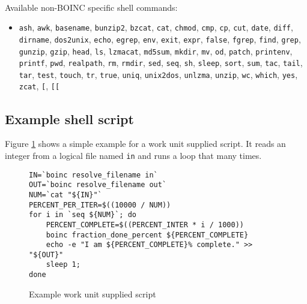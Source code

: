 \documentclass[a4paper,12pt,titlepage,dvipdfm]{article}
\begin{document}
\paragraph*{} Available non-BOINC specific shell commands:
\begin{itemize}
    \item \texttt{ash}, \texttt{awk}, \texttt{basename}, \texttt{bunzip2}, \texttt{bzcat}, \texttt{cat}, \texttt{chmod}, \texttt{cmp}, \texttt{cp},
     \texttt{cut}, \texttt{date}, \texttt{diff}, \texttt{dirname}, \texttt{dos2unix}, \texttt{echo}, \texttt{egrep}, \texttt{env}, \texttt{exit}, 
     \texttt{expr}, \texttt{false}, \texttt{fgrep}, \texttt{find}, \texttt{grep}, \texttt{gunzip}, \texttt{gzip}, \texttt{head}, \texttt{ls},
     \texttt{lzmacat}, \texttt{md5sum}, \texttt{mkdir}, \texttt{mv}, \texttt{od}, \texttt{patch}, \texttt{printenv}, \texttt{printf}, \texttt{pwd},
     \texttt{realpath}, \texttt{rm}, \texttt{rmdir}, \texttt{sed}, \texttt{seq}, \texttt{sh}, \texttt{sleep}, \texttt{sort}, \texttt{sum},
     \texttt{tac}, \texttt{tail}, \texttt{tar}, \texttt{test}, \texttt{touch}, \texttt{tr}, \texttt{true}, \texttt{uniq}, \texttt{unix2dos},
     \texttt{unlzma}, \texttt{unzip}, \texttt{wc}, \texttt{which}, \texttt{yes}, \texttt{zcat}, \texttt{[}, \texttt{[[}
\end{itemize}

\subsection{Example shell script}

Figure \ref{fig:wuscript} shows a simple example for a work unit supplied script. It reads an integer from a logical file named \texttt{in} and runs a loop that many times. 

\lstset{
  breaklines=true,                                     %
  language=make,
  frame=trbl,
  framesep=5pt,
  basicstyle=\small,
  keywordstyle=\ttfamily,
  identifierstyle=\texttt,
  stringstyle=\ttfamily,
  linewidth=\textwidth,
  numbers=none
}

\begin{figure}[htb]
\begin{lstlisting}[breaklines=true]
IN=`boinc resolve_filename in`
OUT=`boinc resolve_filename out`
NUM=`cat "${IN}"`
PERCENT_PER_ITER=$((10000 / NUM))
for i in `seq ${NUM}`; do
    PERCENT_COMPLETE=$((PERCENT_INTER * i / 1000))
    boinc fraction_done_percent ${PERCENT_COMPLETE}
    echo -e "I am ${PERCENT_COMPLETE}% complete." >> "${OUT}"
    sleep 1;
done
\end{lstlisting}
\caption{Example work unit supplied script}\label{fig:wuscript}
\end{figure}
\end{document}
